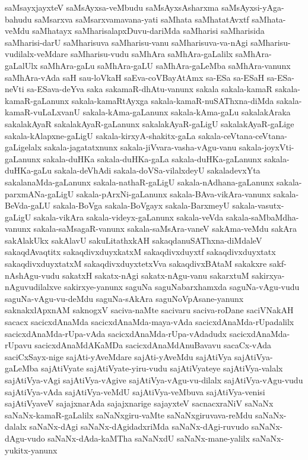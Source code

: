 {saMsayxjayxteV
saMsAyxsa-veMbudu
saMsAyxsAsharxma
saMsAyxsi-yAga-bahudu
saMsarxva
saMsarxvamavana-yati
saMhata
saMhatatAvxtf
saMhata-veMdu
saMhatayx
saMharisalapxDuvu-dariMda
saMharisi
saMharisida
saMharisi-darU
saMharisuva
saMharisu-vanu
saMharisuva-va-nAgi
saMharisu-vudilalx-veMdare
saMharisu-vudu
saMhAra
saMhAra-gaLalilx
saMhAra-gaLalUlx
saMhAra-gaLu
saMhAra-gaLU
saMhAra-gaLeMba
saMhAra-vanunx
saMhAra-vAda
saH
sau-loVkaH
saEva-coVBayAtAmx
sa-ESa
sa-ESaH
sa-ESa-neVti
sa-ESava-deYva
saka
sakamaR-dhAtu-vanunx
sakala
sakala-kamaR
sakala-kamaR-gaLanunx
sakala-kamaRtAyxga
sakala-kamaR-nuSAThxna-diMda
sakala-kamaR-vuLaLxvanU
sakala-kAma-gaLanunx
sakala-kAma-gaLu
sakalakAraka
sakalakAyaR
sakalakAyaR-gaLanunx
sakalakAyaR-gaLigU
sakalakAyaR-gaLige
sakala-kAlapxne-gaLigU
sakala-kirxyA-shakitx-gaLa
sakala-ceVtana-ceVtana-gaLigelalx
sakala-jagatatxnunx
sakala-jiVvara-vasha-vAgu-vanu
sakala-joyxVti-gaLanunx
sakala-duHKa
sakala-duHKa-gaLa
sakala-duHKa-gaLanunx
sakala-duHKa-gaLu
sakala-deVhAdi
sakala-doVSa-vilalxdeyU
sakaladevxYta
sakalanaMda-gaLanunx
sakala-nathaR-gaLigU
sakala-nAdhana-gaLanunx
sakala-parxmANa-gaLigU
sakala-pArxNi-gaLanunx
sakala-BAva-vikAra-vanunx
sakala-BeVda-gaLU
sakala-BoVga
sakala-BoVgayx
sakala-BarxmeyU
sakala-vasutx-gaLigU
sakala-vikAra
sakala-videyx-gaLanunx
sakala-veVda
sakala-saMbaMdha-vanunx
sakala-saMsagaR-vanunx
sakala-saMsAra-vaneV
sakAma-veMdu
sakAra
sakAlakUkx
sakAlavU
sakuLitathxkAH
sakaqdanuSAThxna-diMdaleV
sakaqdAvaqtitx
sakaqdivxduyxkatxM
sakaqdivxduyxtf
sakaqdivxduyxtatx
sakaqdivxduyxtatxM
sakaqdivxduyxtetxVva
sakaqdivxBAtaM
sakakxre
sakf-nAshAgu-vudu
sakatxH
sakatx-nAgi
sakatx-nAgu-vanu
sakarxtuM
sakirxya-nAguvudilalxve
sakirxye-yanunx
saguNa
saguNabarxhamxda
saguNa-vAgu-vudu
saguNa-vAgu-vu-deMdu
saguNa-sAkAra
saguNoVpAsane-yanunx
saknakxlApxnAM
saknogxV
saciva-naMte
sacivaru
saciva-roDane
saciVNakAH
sacacx
sacicxdAnaMda
sacicxdAnaMda-maya-vAda
sacicxdAnaMda-rUpadalilx
sacicxdAnaMda-rUpa-vAda
sacicxdAnaMda-rUpa-vAdadudx
sacicxdAnaMda-rUpavu
sacicxdAnaMdAKaMDa
sacicxdAnaMdAnuBavavu
sacaCx-vAda
saciCxSayx-nige
sajAti-yAveMdare
sajAti-yAveMdu
sajAtiVya
sajAtiVya-gaLeMba
sajAtiVyate
sajAtiVyate-yiru-vudu
sajAtiVyateye
sajAtiVya-valalx
sajAtiVya-vAgi
sajAtiVya-vAgive
sajAtiVya-vAgu-vu-dilalx
sajAtiVya-vAgu-vudu
sajAtiVya-vAda
sajAtiVya-veMdU
sajAtiVya-veMbuva
sajAtiVya-venisi
sajAtiVyaveV
sajajxnarAda
sajajxnarige
sajayxteV
sacnacxraNiV
saNaNx
saNaNx-kamaR-gaLalilx
saNaNxgiru-vaMte
saNaNxgiruvava-reMdu
saNaNx-dalalx
saNaNx-dAgi
saNaNx-dAgidadxriMda
saNaNx-dAgi-ruvudo
saNaNx-dAgu-vudo
saNaNx-dAda-kaMTha
saNaNxdU
saNaNx-mane-yalilx
saNaNx-yukitx-yanunx
}
